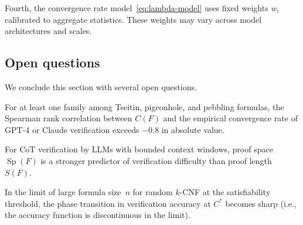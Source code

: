 Fourth, the convergence rate model~\eqref{eq:lambda-model} uses fixed weights
$w_i$ calibrated to aggregate statistics.  These weights may vary across model
architectures and scales.

\subsection{Open questions}\label{sec:open}

We conclude this section with several open questions.

\begin{conjecture}\label{conj:empirical}
For at least one family among Tseitin, pigeonhole, and pebbling formulas, the
Spearman rank correlation between $C(F)$ and the empirical convergence rate of
GPT-4 or Claude verification exceeds $-0.8$ in absolute value.
\end{conjecture}

\begin{conjecture}\label{conj:space}
For CoT verification by LLMs with bounded context windows, proof space
$\operatorname{Sp}(F)$ is a stronger predictor of verification difficulty than
proof length~$S(F)$.
\end{conjecture}

\begin{conjecture}\label{conj:sharp}
In the limit of large formula size~$n$ for random $k$-CNF at the
satisfiability threshold, the phase transition in verification accuracy at
$C^*$ becomes sharp (i.e., the accuracy function is discontinuous in the
limit).
\end{conjecture}
